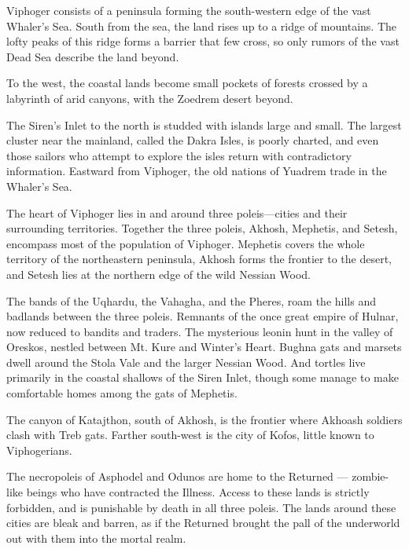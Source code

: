 Viphoger consists of a peninsula forming the south-western edge of the vast Whaler's Sea.
South from the sea, the land rises up to a ridge of mountains.
The lofty peaks of this ridge forms a barrier that few cross, so only rumors of the vast Dead Sea describe the land beyond.

To the west, the coastal lands become small pockets of forests crossed by a labyrinth of arid canyons, with the Zoedrem desert beyond.

The Siren's Inlet to the north is studded with islands large and small.
The largest cluster near the mainland, called the Dakra Isles, is poorly charted, and even those sailors who attempt to explore the isles return with contradictory information.
Eastward from Viphoger, the old nations of Yuadrem trade in the Whaler's Sea. %

The heart of Viphoger lies in and around three poleis—cities and their surrounding territories.
Together the three poleis, Akhosh, Mephetis, and Setesh, encompass most of the population of Viphoger.
Mephetis covers the whole territory of the northeastern peninsula, Akhosh forms the frontier to the desert, and Setesh lies at the northern edge of the wild Nessian Wood.

The bands of the Uqhardu, the Vahagha, and the Pheres, roam the hills and badlands between the three poleis.
Remnants of the once great empire of Hulnar, now reduced to bandits and traders.
The mysterious leonin hunt in the valley of Oreskos, nestled between Mt. Kure and Winter's Heart.
Bughna gats and marsets dwell around the Stola Vale and the larger Nessian Wood.
And tortles live primarily in the coastal shallows of the Siren Inlet, though some manage to make comfortable homes among the gats of Mephetis.

The canyon of Katajthon, south of Akhosh, is the frontier where Akhoash soldiers clash with Treb gats.
Farther south-west is the city of Kofos, little known to Viphogerians.

The necropoleis of Asphodel and Odunos are home to the Returned --- zombie-like beings who have contracted the Illness.
Access to these lands is strictly forbidden, and is punishable by death in all three poleis.
The lands around these cities are bleak and barren, as if the Returned brought the pall of the underworld out with them into the mortal realm.



\newpage~\newpage

